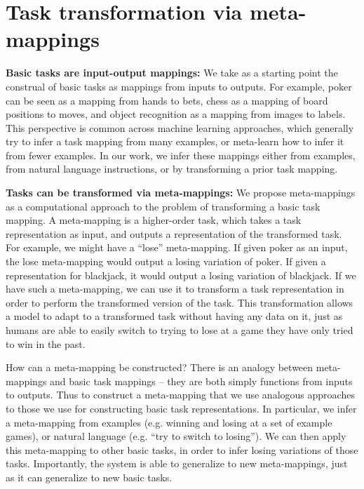 \section{Task transformation via meta-mappings} \label{sec:HoMM:metamappings}

\textbf{Basic tasks are input-output mappings:} We take as a starting point the construal of basic tasks as mappings from inputs to outputs. For example, poker can be seen as a mapping from hands to bets, chess as a mapping of board positions to moves, and object recognition as a mapping from images to labels. This perspective is common across machine learning approaches, which generally try to infer a task mapping from many examples, or meta-learn how to infer it from fewer examples. In our work, we infer these mappings either from examples, from natural language instructions, or by transforming a prior task mapping. 

\textbf{Tasks can be transformed via meta-mappings:} We propose meta-mappings as a computational approach to the problem of transforming a basic task mapping. A meta-mapping is a higher-order task, which takes a task representation as input, and outputs a representation of the transformed task. For example, we might have a ``lose'' meta-mapping. If given poker as an input, the lose meta-mapping would output a losing variation of poker. If given a representation for blackjack, it would output a losing variation of blackjack. If we have such a meta-mapping, we can use it to transform a task representation in order to perform the transformed version of the task. This transformation allows a model to adapt to a transformed task without having any data on it, just as humans are able to easily switch to trying to lose at a game they have only tried to win in the past. 

How can a meta-mapping be constructed? There is an analogy between meta-mappings and basic task mappings -- they are both simply functions from inputs to outputs. Thus to construct a meta-mapping that we use analogous approaches to those we use for constructing basic task representations. In particular, we infer a meta-mapping from examples (e.g. winning and losing at a set of example games), or natural language (e.g. ``try to switch to losing''). We can then apply this meta-mapping to other basic tasks, in order to infer losing variations of those tasks. Importantly, the system is able to generalize to new meta-mappings, just as it can generalize to new basic tasks. 



